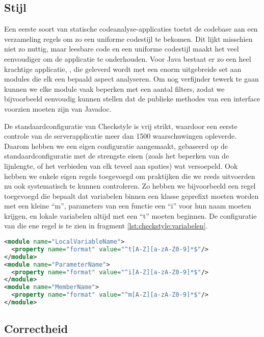 \subsection{Stijl}
\label{server:realisatie:codeanalyse:stijl}

Een eerste soort van statische codeanalyse-applicaties toetst de codebase aan een verzameling regels om zo een uniforme codestijl te bekomen. Dit lijkt misschien niet zo nuttig, maar leesbare code en een uniforme codestijl maakt het veel eenvoudiger om de applicatie te onderhouden.
Voor Java bestaat er zo een heel krachtige applicatie, , die geleverd wordt met een enorm uitgebreide set aan modules die elk een bepaald aspect analyseren. Om nog verfijnder tewerk te gaan kunnen we elke module vaak beperken met een aantal filters, zodat we bijvoorbeeld eenvoudig kunnen stellen dat de publieke methodes van een interface voorzien moeten zijn van Javadoc.

De standaardconfiguratie van Checkstyle is vrij strikt, waardoor een eerste controle van de serverapplicatie meer dan 1500 waarschuwingen opleverde. Daarom hebben we een eigen configuratie aangemaakt, gebaseerd op de standaardconfiguratie met de strengste eisen (zoals het beperken van de lijnlengte, of het verbieden van elk teveel aan spaties) wat versoepeld. Ook hebben we enkele eigen regels toegevoegd om praktijken die we reeds uitvoerden nu ook systematisch te kunnen controleren. Zo hebben we bijvoorbeeld een regel toegevoegd die bepaalt dat variabelen binnen een klasse geprefixt moeten worden met een kleine ``m'', parameters van een functie een ``i'' voor hun naam moeten krijgen, en lokale variabelen altijd met een ``t'' moeten beginnen. De configuratie van die ene regel is te zien in fragment \ref{lst:checkstyle:variabelen}.

\begin{lstlisting}[language=XML, float, caption=Checkstyle configuratie voor de naamgeving van variabelen., label=lst:checkstyle:variabelen]
<module name="LocalVariableName">
  <property name="format" value="^t[A-Z][a-zA-Z0-9]*$"/>
</module>
<module name="ParameterName">
  <property name="format" value="^i[A-Z][a-zA-Z0-9]*$"/>
</module>
<module name="MemberName">
  <property name="format" value="^m[A-Z][a-zA-Z0-9]*$"/>
</module>
\end{lstlisting}

\subsection{Correctheid}
\label{server:realisatie:codeanalyse:correctheid}

